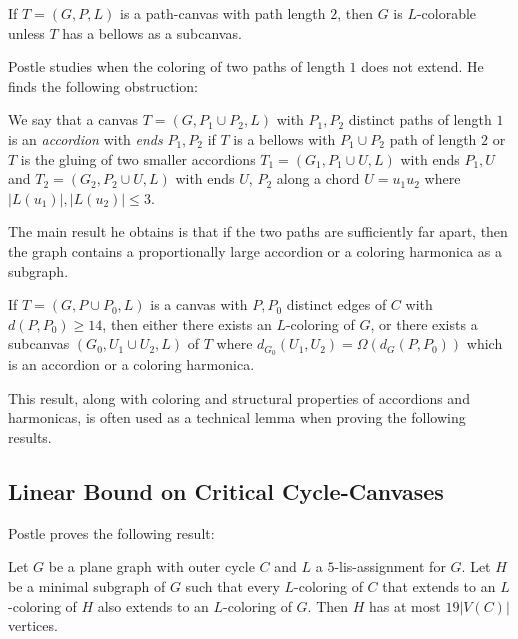 

\begin{theorem}
	If $T = (G, P, L)$ is a path-canvas with path length $2$, then $G$ is $L$-colorable unless $T$ has a bellows as a subcanvas.
\end{theorem}

Postle studies when the coloring of two paths of length $1$ does not extend. He finds the following obstruction:

\begin{definition}[Accordion]
	We say that a canvas $T = (G, P_1 \cup P_2, L)$ with $P_1, P_2$ distinct paths of length $1$ is an \emph{accordion} with \emph{ends} $P_1, P_2$ if $T$ is a bellows with $P_1 \cup P_2$ path of length $2$ or $T$ is the gluing of two smaller accordions $T_1 = (G_1, P_1 \cup U, L)$ with ends $P_1, U$ and $T_2 = (G_2, P_2 \cup U, L)$ with ends $U$, $P_2$ along a chord $U = u_1u_2$ where $|L(u_1)|, |L(u_2)| \leq 3$.
\end{definition}

The main result he obtains is that if the two paths are sufficiently far apart, then the graph contains a proportionally large accordion or a coloring harmonica as a subgraph.

\begin{theorem}
\label{bottlenecktheorem}
If $T = (G, P \cup P_0 , L)$ is a canvas with $P, P_0$ distinct edges of $C$ with $d(P, P_0) \geq 14$, then either there exists an $L$-coloring of $G$, or there exists a subcanvas $(G_0 , U_1 \cup U_2 , L)$ of $T$ where $d_{G_0} (U_1, U_2) = \Omega(d_G (P, P_0))$ which is an accordion or a coloring harmonica.
\end{theorem}

This result, along with coloring and structural properties of accordions and harmonicas, is often used as a technical lemma when proving the following results.

\subsection{Linear Bound on Critical Cycle-Canvases}

Postle proves the following result:

\begin{theorem}
\label{linearboundcycletheorem}
Let $G$ be a plane graph with outer cycle $C$ and $L$ a $5$-lis-assignment for $G$. Let $H$ be a minimal subgraph of $G$ such that every $L$-coloring of $C$ that extends to an $L$-coloring of $H$ also extends to an $L$-coloring of $G$. Then $H$ has at most $19|V(C)|$ vertices.
\end{theorem}

